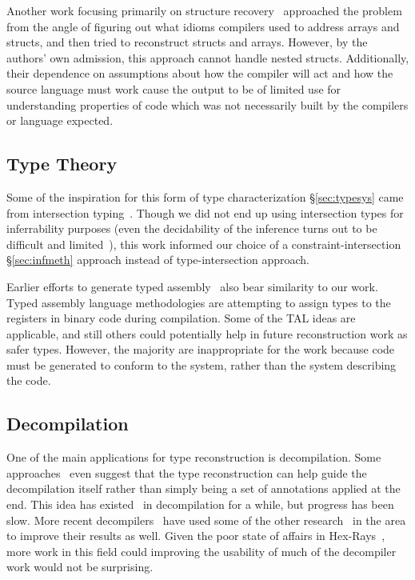 Another work focusing primarily on structure recovery~\cite{comprecon} approached the problem from the angle of figuring out what idioms compilers used to address arrays and structs, and then tried to reconstruct structs and arrays. However, by the authors' own admission, this approach cannot handle nested structs. Additionally, their dependence on assumptions about how the compiler will act and how the source language must work cause the output to be of limited use for understanding properties of code which was not necessarily built by the compilers or language expected.

\subsection{Type Theory}
Some of the inspiration for this form of type characterization \S\ref{sec:typesys} came from intersection typing~\cite{Jim1995,Shao1993}. Though we did not end up using intersection types for inferrability purposes (even the decidability of the inference turns out to be difficult and limited~\cite{interdecide}), this work informed our choice of a constraint-intersection \S\ref{sec:infmeth} approach instead of type-intersection approach.

Earlier efforts to generate typed assembly~\cite{tal,stal} also bear similarity to our work. Typed assembly language methodologies are attempting to assign types to the registers in binary code during compilation. Some of the TAL ideas are applicable, and still others could potentially help in future reconstruction work as safer types. However, the majority are inappropriate for the work because code must be generated to conform to the system, rather than the system describing the code.

\subsection{Decompilation}
One of the main applications for type reconstruction is decompilation. Some approaches~\cite{tydecomp} even suggest that the type reconstruction can help guide the decompilation itself rather than simply being a set of annotations applied at the end. This idea has existed~\cite{dolgova2009automatic} in decompilation for a while, but progress has been slow. More recent decompilers~\cite{phoenix} have used some of the other research~\cite{tie} in the area to improve their results as well. Given the poor state of affairs in Hex-Rays~\cite{ida}, more work in this field could improving the usability of much of the decompiler work would not be surprising.
